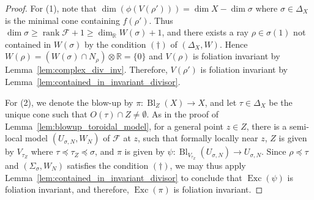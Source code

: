 \documentclass[12pt,reqno]{amsart}
\theoremstyle{definition}
\newcommand{\on}{\operatorname}
\newcommand\cF{{\mathcal{F}}}
\newcommand\bR{{\mathbb R}}
\begin{document}
\begin{proof}
    For (1), note that $\dim(\phi(V(\rho')))=\dim X-\dim \sigma$ where $\sigma\in\Delta_X$ is the minimal cone containing $f(\rho')$. Thus $\dim\sigma\geq\on{rank}\cF + 1\geq\dim_\bR W(\sigma)+1$, and there exists a ray $\rho\in\sigma(1)$ not contained in $W(\sigma)$ by the condition $(\dagger)$ of $(\Delta_X,W)$. 
    Hence $W(\rho) = (W(\sigma)\cap N_\rho)\otimes\bR = \{0\}$ and $V(\rho)$ is foliation invariant by Lemma~\ref{lem:complex_div_inv}. 
    Therefore, $V(\rho')$ is foliation invariant by Lemma~\ref{lem:contained_in_invariant_divisor}.
    
    For (2), we denote the blow-up by $\pi\colon \on{Bl}_{Z}(X)\to X$, and let $\tau\in\Delta_X$ be the unique cone such that $O(\tau)\cap Z\neq\emptyset$. As in the proof of
    Lemma~\ref{lem:blowup_toroidal_model}, for a general point $z\in Z$, there is a semi-local model $(U_{\sigma,N},W_N)$ of $\cF$ at $z$, such that formally locally near $z$, $Z$ is given by $V_{\tau_Z}$ where $\tau\preceq\tau_Z\preceq \sigma$, and $\pi$ is given by $\psi\colon \on{Bl}_{V_{\tau_Z}}(U_{\sigma,N})\to U_{\sigma,N}$. Since $\rho\preceq \tau$ and $(\Sigma_\sigma,W_N)$ satisfies the condition $(\dagger)$, we may thus apply Lemma~\ref{lem:contained_in_invariant_divisor} to conclude that $\on{Exc}(\psi)$ is foliation invariant, and therefore, $\on{Exc}(\pi)$ is foliation invariant.
\end{proof}
\end{document}
